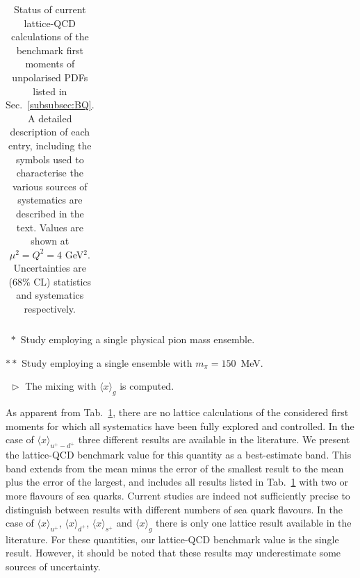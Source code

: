 \begin{table}[t]
\begin{threeparttable}
\begin{tabular}{llcllccccccl}
\bottomrule
\end{tabular}
\begin{tablenotes}
\footnotesize
\item[$\ \,*$] Study employing a single physical pion mass ensemble.
\item[$**$] Study employing a single ensemble with $m_\pi=150$~MeV.
\item[$\ \,\triangleright$] The mixing with $\langle x\rangle_{g}$ is computed.
\end{tablenotes}
\end{threeparttable}
\caption{\small Status of current lattice-QCD calculations of the benchmark 
first moments of unpolarised PDFs listed in Sec.~\ref{subsubsec:BQ}.
%
A detailed description of each entry, including the symbols used to 
characterise the various sources of systematics are described in the text.
%
Values are shown at $\mu^2=Q^2=4$ GeV$^2$.
%
Uncertainties are (68\% CL) statistics and systematics respectively.}
\label{tab:unpolLQCDstatus1}
\end{table}

As apparent from Tab.~\ref{tab:unpolLQCDstatus1}, there are no lattice 
calculations of the considered first moments for which all systematics 
have been fully explored and controlled. 
%
In the case of $\langle x\rangle_{u^+-d^+}$ three different results are available 
in the literature.
%
We present the lattice-QCD benchmark value for this quantity 
as a best-estimate band.
% 
This band extends from the mean minus the error of the smallest result to the 
mean plus the error of the largest, and includes all results listed in 
Tab.~\ref{tab:unpolLQCDstatus1} with two or more flavours of sea quarks.
%
Current studies are indeed not sufficiently precise to distinguish between 
results with different numbers of sea quark flavours.
%
In the case of $\langle x \rangle_{u^+}$, $\langle x \rangle_{d^+}$, 
$\langle x \rangle_{s^+}$ and $\langle x \rangle_g$ there is only one
lattice result available in the literature. 
%
For these quantities, our lattice-QCD benchmark value is the single result.
% 
However, it should be noted that these results may underestimate some sources 
of uncertainty. 

